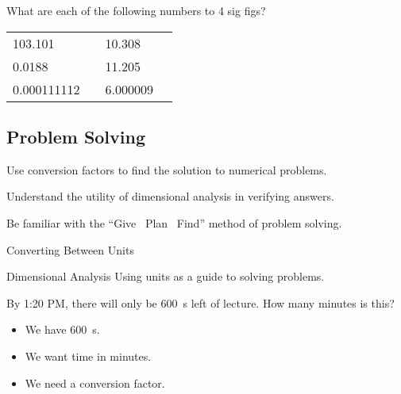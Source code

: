 \documentclass[10pt,letterpaper,twoside]{article}
\begin{document}
\begin{onyourown}%
	What are each of the following numbers to 4 sig figs?
	\begin{center}
		\renewcommand\arraystretch{2}
		\begin{tabularx}{\linewidth} {*{4}{X}}
			103.101 & & 10.308 & \\
			0.0188 & & 11.205 & \\
			0.000111112 & & 6.000009 & \\
		\end{tabularx}
	\end{center}
\end{onyourown}

\begin{frame}{}
	\section{Problem Solving}
	\begin{learningobjectives}
	\item Use conversion factors to find the solution to numerical problems.
	\item Understand the utility of dimensional analysis in verifying answers.
	\item Be familiar with the ``Give \textrightarrow\ Plan \textrightarrow\ Find'' method of problem solving.
	\end{learningobjectives}
\end{frame}


\begin{frame}{Converting Between Units}
	\begin{block}{Dimensional Analysis}
		Using units as a guide to solving problems.
	\end{block}

	By 1:20 PM, there will only be \SI{600}{\second} left of lecture. How many
	minutes is this?

	\begin{itemize}
		\item<2-> We have \alert{\SI{600}{\second}}.
		\item<3-> We want \alert{time in minutes}.
		\item<4-> We need \alert{a conversion factor}.
	\end{itemize}

\end{frame}
\end{document}
